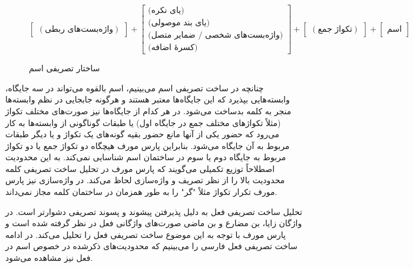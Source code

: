 \documentclass[12pt,onecolumn,a4paper]{article}
\begin{document}
    \begin{figure}[hp]
        \[
            \begin{bmatrix}
                (\textrm{واژه‌بست‌های ربطی})
            \end{bmatrix}
            +
            \begin{bmatrix}
                \textrm{(یای نکره)} \\
                \textrm{(یای بند موصولی)} \\
                \textrm{(واژه‌بست‌های شخصی / ضمایر متصل)} \\
                \textrm{(کسرهٔ اضافه)}
            \end{bmatrix}
            +
            \begin{bmatrix}
                (\textrm{تکواژ جمع})
            \end{bmatrix}
            +
            \begin{bmatrix}
                \textrm{اسم}
            \end{bmatrix}
        \]
        \caption{ساختار تصریفی اسم {\mfo\citep{eslami_88}}}
    \end{figure}

    \par
    چنانچه در ساخت تصریفی اسم می‌بینیم، اسم بالقوه می‌تواند در سه جایگاه، وابسته‌هایی بپذیرد که این جایگاه‌ها معتبر هستند و هرگونه جابجایی در نظم وابسته‌ها منجر به کلمه بدساخت می‌شود. در هر کدام از جایگاه‌ها نیز صورت‌های مختلف تکواژ (مثلاً تکواژهای مختلف جمع در جایگاه اول) یا طبقات گوناگونی از وابسته‌ها به کار می‌رود که حضور یکی از آنها مانع حضور بقیه گونه‌های یک تکواژ و یا دیگر طبقات مربوط به آن جایگاه می‌شود. بنابراین پارس مورف هیچگاه دو تکواژ جمع یا دو تکواژ مربوط به جایگاه دوم یا سوم در ساختمان اسم شناسایی نمی‌کند. به این محدودیت اصطلاحاً توزیع تکمیلی  می‌گویند که پارس مورف در تحلیل ساخت تصریفی کلمه محدودیت بالا را از نظر تصریف و واژه‌سازی لحاظ می‌کند. در واژه‌سازی نیز پارس مورف تکرار تکواژ مثلاً "گر" را به طور همزمان در ساختمان کلمه مجاز نمی‌داند.

    \par
    تحلیل ساخت تصریفی فعل به دلیل پذیرفتن پیشوند و پسوند تصریفی دشوارتر است. در واژگان زایا، بن مضارع و بن ماضی صورت‌های واژگانی فعل در نظر گرفته شده است و پارس مورف با توجه به این موضوع ساخت تصریفی فعل را تحلیل می‌کند. در ادامه ساخت تصریفی فعل فارسی را می‌بینیم که محدودیت‌های ذکرشده در خصوص اسم در فعل نیز مشاهده می‌شود.
\end{document}
